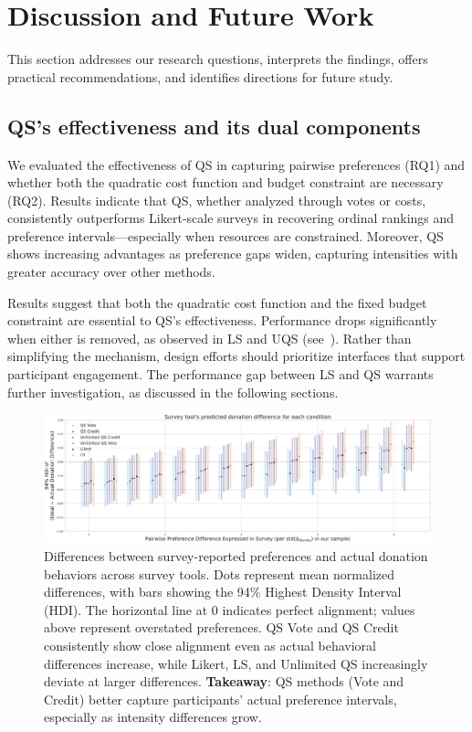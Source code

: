 \section{Discussion and Future Work}
\label{sec:discussion}
This section addresses our research questions, interprets the findings, offers practical recommendations, and identifies directions for future study.

\subsection{QS's effectiveness and its dual components}
We evaluated the effectiveness of QS in capturing pairwise preferences (RQ1) and whether both the quadratic cost function and budget constraint are necessary (RQ2). Results indicate that QS, whether analyzed through votes or costs, consistently outperforms Likert-scale surveys in recovering ordinal rankings and preference intervals—especially when resources are constrained. Moreover, QS shows increasing advantages as preference gaps widen, capturing intensities with greater accuracy over other methods.

Results suggest that both the quadratic cost function and the fixed budget constraint are essential to QS’s effectiveness. Performance drops significantly when either is removed, as observed in LS and UQS (see~). Rather than simplifying the mechanism, design efforts should prioritize interfaces that support participant engagement. The performance gap between LS and QS warrants further investigation, as discussed in the following sections.



\begin{figure}[h]
    \centering
    \includegraphics[width=\textwidth]{content/image/posterior_predictive_cumulative.pdf}
    \caption{Differences between survey-reported preferences and actual donation behaviors across survey tools. Dots represent mean normalized differences, with bars showing the 94\% Highest Density Interval (HDI). The horizontal line at 0 indicates perfect alignment; values above represent overstated preferences. QS Vote and QS Credit consistently show close alignment even as actual behavioral differences increase, while Likert, LS, and Unlimited QS increasingly deviate at larger differences. \textbf{Takeaway}: QS methods (Vote and Credit) better capture participants' actual preference intervals, especially as intensity differences grow.}
    \label{fig:comparison}
\end{figure}

